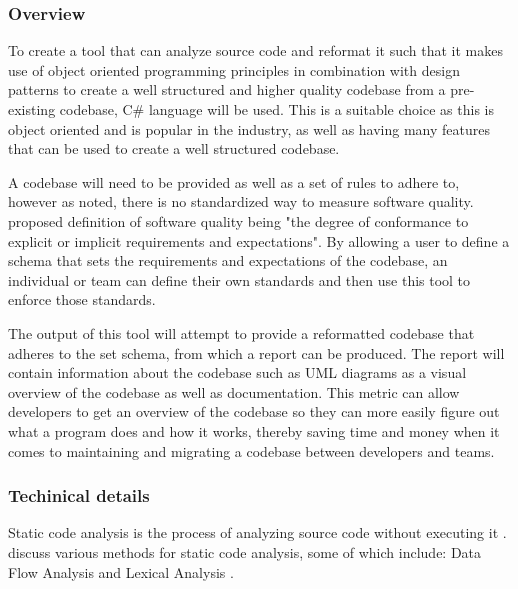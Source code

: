
\subsubsection{Overview}
To create a tool that can analyze source code and reformat it such that it makes use of object oriented programming principles in combination with design patterns to create a well structured and higher quality codebase from a pre-existing codebase, C\# language will be used. This is a suitable choice as this is object oriented and is popular in the industry, as well as having many features that can be used to create a well structured codebase.

A codebase will need to be provided as well as a set of rules to adhere to, however as noted, there is no standardized way to measure software quality. \cite{8681007} proposed definition of software quality being "the degree of conformance to explicit or implicit requirements and expectations". By allowing a user to define a schema that sets the requirements and expectations of the codebase, an individual or team can define their own standards and then use this tool to enforce those standards.

The output of this tool will attempt to provide a reformatted codebase that adheres to the set schema, from which a report can be produced. The report will contain information about the codebase such as UML diagrams as a visual overview of the codebase as well as documentation. This metric can allow developers to get an overview of the codebase so they can more easily figure out what a program does and how it works, thereby saving time and money when it comes to maintaining and migrating a codebase between developers and teams.

\subsubsection{Techinical details}
Static code analysis is the process of analyzing source code without executing it \citep{8802820}. \cite{owasp/StaticCodeAnalysis} discuss various methods for static code analysis, some of which include: Data Flow Analysis \citep{owasp/StaticCodeAnalysis} and Lexical Analysis \citep{owasp/StaticCodeAnalysis}.

